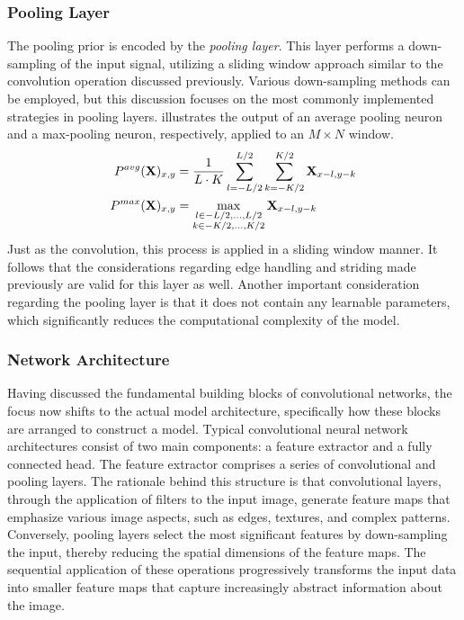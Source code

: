 \subsubsection{Pooling Layer}
The pooling prior is encoded by the \emph{pooling layer}. This layer performs a
down-sampling of the input signal, utilizing a sliding window approach similar
to the convolution operation discussed previously. Various down-sampling methods
can be employed, but this discussion focuses on the most commonly implemented
strategies in pooling layers.  illustrates the output of an average
pooling neuron and a max-pooling neuron, respectively, applied to an $M \times
N$ window.
\begin{equation}
    \labeq{2_20}
    \begin{split}
    P^{avg}(\mathbf{X})_{x, y} &= \frac{1}{L \cdot K} \sum^{L/2}_{l=-L/2}\sum^{K/2}_{k=-K/2} \mathbf{X}_{x - l, y - k}\\
    P^{max}(\mathbf{X})_{x, y} &= \max_{\substack{l \in -L/2, \dots, L/2\\k \in -K/2, \dots, K/2}} \mathbf{X}_{x - l, y - k}
    \end{split}
\end{equation}
Just as the convolution, this process is applied in a sliding window manner. It
follows that the considerations regarding edge handling and striding made
previously are valid for this layer as well. Another important consideration
regarding the pooling layer is that it does not contain any learnable
parameters, which significantly reduces the computational complexity of the
model.

\subsubsection{Network Architecture}
Having discussed the fundamental building blocks of convolutional networks, the
focus now shifts to the actual model architecture, specifically how these blocks
are arranged to construct a model.
Typical convolutional neural network architectures consist of two main
components: a feature extractor and a fully connected head. The feature
extractor comprises a series of convolutional and pooling layers. The rationale
behind this structure is that convolutional layers, through the application of
filters to the input image, generate feature maps that emphasize various image
aspects, such as edges, textures, and complex patterns. Conversely, pooling
layers select the most significant features by down-sampling the input, thereby
reducing the spatial dimensions of the feature maps. The sequential application
of these operations progressively transforms the input data into smaller feature
maps that capture increasingly abstract information about the image.

